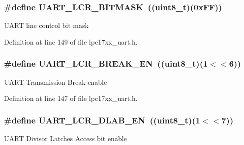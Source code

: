 \subsubsection[{\texorpdfstring{U\+A\+R\+T\+\_\+\+L\+C\+R\+\_\+\+B\+I\+T\+M\+A\+SK}{UART_LCR_BITMASK}}]{\setlength{\rightskip}{0pt plus 5cm}\#define U\+A\+R\+T\+\_\+\+L\+C\+R\+\_\+\+B\+I\+T\+M\+A\+SK~(({\bf uint8\+\_\+t})(0x\+F\+F))}\hypertarget{group___u_a_r_t___private___macros_ga28e31fe85eeeb124ff6a471978155356}{}\label{group___u_a_r_t___private___macros_ga28e31fe85eeeb124ff6a471978155356}
U\+A\+RT line control bit mask 

Definition at line 149 of file lpc17xx\+\_\+uart.\+h.

\subsubsection[{\texorpdfstring{U\+A\+R\+T\+\_\+\+L\+C\+R\+\_\+\+B\+R\+E\+A\+K\+\_\+\+EN}{UART_LCR_BREAK_EN}}]{\setlength{\rightskip}{0pt plus 5cm}\#define U\+A\+R\+T\+\_\+\+L\+C\+R\+\_\+\+B\+R\+E\+A\+K\+\_\+\+EN~(({\bf uint8\+\_\+t})(1$<$$<$6))}\hypertarget{group___u_a_r_t___private___macros_ga2f83aa82aecd63cf457ea423be643d57}{}\label{group___u_a_r_t___private___macros_ga2f83aa82aecd63cf457ea423be643d57}
U\+A\+RT Transmission Break enable 

Definition at line 147 of file lpc17xx\+\_\+uart.\+h.

\subsubsection[{\texorpdfstring{U\+A\+R\+T\+\_\+\+L\+C\+R\+\_\+\+D\+L\+A\+B\+\_\+\+EN}{UART_LCR_DLAB_EN}}]{\setlength{\rightskip}{0pt plus 5cm}\#define U\+A\+R\+T\+\_\+\+L\+C\+R\+\_\+\+D\+L\+A\+B\+\_\+\+EN~(({\bf uint8\+\_\+t})(1$<$$<$7))}\hypertarget{group___u_a_r_t___private___macros_gaae9c53e30321d4cac13137c66b022e9e}{}\label{group___u_a_r_t___private___macros_gaae9c53e30321d4cac13137c66b022e9e}
U\+A\+RT Divisor Latches Access bit enable 

